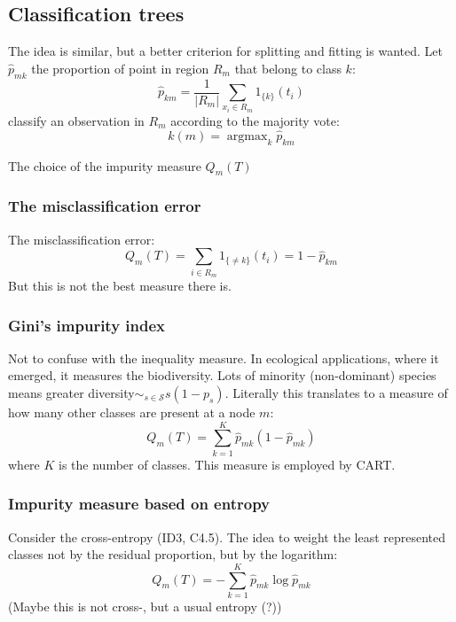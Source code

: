 \documentclass[a4paper]{article}
\newcommand{\argmax}{\mathop{\text{argmax}}}
\begin{document}

\subsection{Classification trees} %
\label{sub:classification_trees}

The idea is similar, but a better criterion for splitting and fitting is wanted.
Let $\hat{p}_{mk}$ the proportion of point in region $R_m$ that belong to class $k$:
\[\hat{p}_{km} = \frac{1}{|R_m|} \sum_{x_i\in R_m} 1_{\{k\}}(t_i) \]
classify an observation in $R_m$ according to the majority vote:
\[k(m) = \argmax_k \hat{p}_{km}\]

The choice of the impurity measure $Q_m(T)$
\subsubsection{The misclassification error} %
\label{ssub:the_misclassification_error}

The misclassification error:
\[
Q_m(T)
= \sum_{i \in R_m} 1_{\{\neq k\}}(t_i)
= 1 - \hat{p}_{km}
\]
But this is not the best measure there is.

\subsubsection{Gini's impurity index} %
\label{ssub:gini_s_impurity_index}

Not to confuse with the inequality measure. In ecological applications, where it
emerged, it measures the biodiversity. Lots of minority (non-dominant) species means
greater diversity$\sim_{s\in\mathcal{S}} s (1-p_s)$. Literally this translates to a measure
of how many other classes are present at a node $m$:
\[Q_m(T) = \sum_{k=1}^K\hat{p}_{mk}(1-\hat{p}_{mk})\]
where $K$ is the number of classes. This measure is employed by CART.


\subsubsection{Impurity measure based on entropy} %
\label{ssub:impurity_measure_based_on_entropy}

Consider the cross-entropy (ID3, C4.5). The idea to weight the least represented
classes not by the residual proportion, but by the logarithm:
\[Q_m(T) = -\sum_{k=1}^K\hat{p}_{mk} \log \hat{p}_{mk}\]
(Maybe this is not cross-, but a usual entropy (?))
\end{document}
